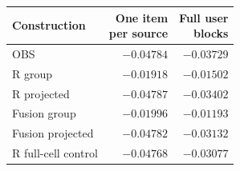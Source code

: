 \begin{tabular}{lrr}
\toprule
Construction & \shortstack{One item\\per source} & \shortstack{Full user\\blocks}\\
\midrule
OBS & $-0.04784$ & $-0.03729$\\
R group & $-0.01918$ & $-0.01502$\\
R projected & $-0.04787$ & $-0.03402$\\
Fusion group & $-0.01996$ & $-0.01193$\\
Fusion projected & $-0.04782$ & $-0.03132$\\
R full-cell control & $-0.04768$ & $-0.03077$\\
\bottomrule
\end{tabular}
